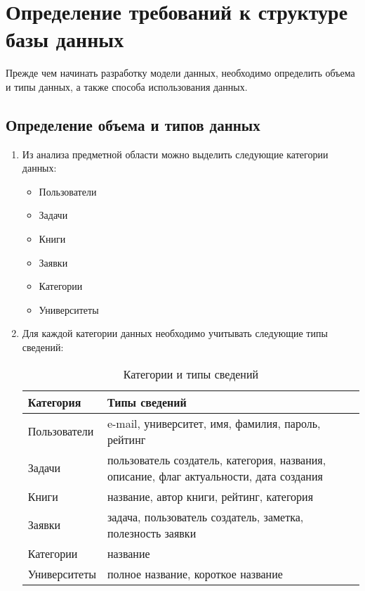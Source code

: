 \section{Определение требований к структуре базы данных}
Прежде чем начинать разработку модели данных, необходимо определить объема и типы данных, а также способа использования данных.
 
\subsection{Определение объема и типов данных }
\begin{enumerate}
\item Из анализа предметной области можно выделить следующие категории данных:
	\begin{itemize}
	\item Пользователи
	\item Задачи
	\item Книги
	\item Заявки
	\item Категории
	\item Университеты
	\end{itemize}


\item Для каждой категории данных необходимо учитывать следующие типы сведений:

\begin{table}[h]
\caption{Категории и типы сведений}
\medskip
\begin{tabular}{|l|p{12cm}|}
\hline
Категория & Типы сведений\\
\hline
Пользователи &  e-mail, университет, имя, фамилия, пароль, рейтинг\\
Задачи & пользователь создатель, категория, названия, описание, флаг актуальности, дата создания  \\
Книги & название, автор книги, рейтинг, категория \\
Заявки & задача, пользователь создатель, заметка, полезность заявки \\
Категории & название \\
Университеты & полное название, короткое название \\
\hline
\end{tabular}
\end{table}

\end{enumerate}

